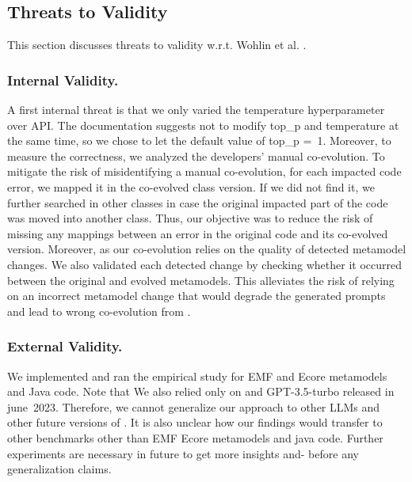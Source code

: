 \subsection{Threats to Validity}
This section discusses threats to validity w.r.t. Wohlin et al. \cite{wohlin2012experimentation}.

\subsubsection{Internal Validity.} 

A first internal threat is that we only varied the temperature hyperparameter over \LLM API. The documentation suggests not to modify top\_p and temperature at the same time, so we chose to let the default value of top\_p =~1. 
Moreover, to measure the correctness, we analyzed the developers' manual co-evolution.
To mitigate the risk of misidentifying a manual co-evolution, for each impacted code error, we mapped it in the co-evolved class version. If we did not find it, we further searched in other classes in case the original impacted part of the code was moved into another class. Thus, our objective was to reduce the risk of missing any mappings between an error in the original code and its co-evolved version. Moreover, as our co-evolution relies on the quality of detected metamodel changes. We also validated each detected change by checking whether it occurred between the original and evolved metamodels. This alleviates the risk of relying on an incorrect metamodel change that would degrade the generated prompts and lead to wrong co-evolution from \LLM. 

\subsubsection{External Validity.}

We implemented and ran the empirical study for EMF and Ecore metamodels and Java code. Note that  
We also relied only on \LLM and GPT-3.5-turbo released in june~2023. 
Therefore, we cannot generalize our approach to other LLMs and other future versions of \LLM. It is also unclear how our findings would transfer to other benchmarks other than EMF Ecore metamodels and java code. Further experiments are necessary in future to get more insights and- before any generalization claims.  


